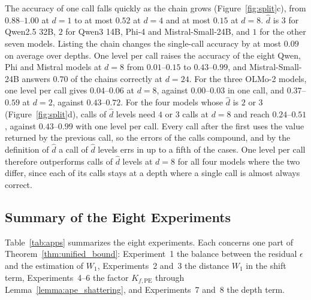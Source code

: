 The accuracy of one call falls quickly as the chain grows (Figure~\ref{fig:split}c), from $0.88$--$1.00$ at $d=1$ to at most $0.52$ at $d=4$ and at most $0.15$ at $d=8$. $\hat d$ is $3$ for Qwen2.5 32B, $2$ for Qwen3 14B, Phi-4 and Mistral-Small-24B, and $1$ for the other seven models. Listing the chain changes the single-call accuracy by at most $0.09$ on average over depths. One level per call raises the accuracy of the eight Qwen, Phi and Mistral models at $d=8$ from $0.01$--$0.15$ to $0.43$--$0.99$, and Mistral-Small-24B answers $0.70$ of the chains correctly at $d=24$. For the three OLMo-2 models, one level per call gives $0.04$--$0.06$ at $d=8$, against $0.00$--$0.03$ in one call, and $0.37$--$0.59$ at $d=2$, against $0.43$--$0.72$. For the four models whose $\hat d$ is $2$ or $3$ (Figure~\ref{fig:split}d), calls of $\hat d$ levels need $4$ or $3$ calls at $d=8$ and reach $0.24$--$0.51$, against $0.43$--$0.99$ with one level per call. Every call after the first uses the value returned by the previous call, so the errors of the calls compound, and by the definition of $\hat d$ a call of $\hat d$ levels errs in up to a fifth of the cases. One level per call therefore outperforms calls of $\hat d$ levels at $d=8$ for all four models where the two differ, since each of its calls stays at a depth where a single call is almost always correct.

\clearpage
\subsection{Summary of the Eight Experiments}
\label{app:uses}

Table~\ref{tab:apps} summarizes the eight experiments. Each concerns one part of Theorem~\ref{thm:unified_bound}: Experiment~1 the balance between the residual $\epsilon$ and the estimation of $W_1$, Experiments~2 and~3 the distance $W_1$ in the shift term, Experiments~4--6 the factor $K_{f,\mathrm{PE}}$ through Lemma~\ref{lemma:ape_shattering}, and Experiments~7 and~8 the depth term.

